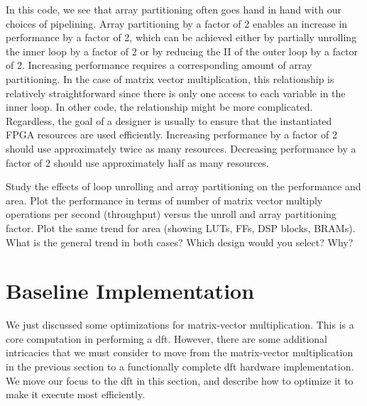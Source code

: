 In this code, we see that array partitioning often goes hand in hand with our choices of pipelining. Array partitioning by a factor of 2 enables an increase in performance by a factor of 2, which can be achieved either by partially unrolling the inner loop by a factor of 2 or by reducing the II of the outer loop by a factor of 2.  Increasing performance requires a corresponding amount of array partitioning.  In the case of matrix vector multiplication, this relationship is relatively straightforward since there is only one access to each variable in the inner loop.  In other code, the relationship might be more complicated.  Regardless, the goal of a designer is usually to ensure that the instantiated FPGA resources are used efficiently.  Increasing performance by a factor of 2 should use approximately twice as many resources.  Decreasing performance by a factor of 2 should use approximately half as many resources.

\begin{exercise}
Study the effects of loop unrolling and array partitioning on the performance and area. Plot the performance in terms of number of matrix vector multiply operations per second (throughput) versus the unroll and array partitioning factor. Plot the same trend for area (showing LUTs, FFs, DSP blocks, BRAMs). What is the general trend in both cases? Which design would you select? Why?
\end{exercise} 


\section{Baseline Implementation}
\label{subsec:dft_implementation}

We just discussed some optimizations for matrix-vector multiplication. This is a core computation in performing a \gls{dft}. However, there are some additional intricacies that we must consider to move from the matrix-vector multiplication in the previous section to a functionally complete \gls{dft} hardware implementation. We move our focus to the \gls{dft} in this section, and describe how to optimize it to make it execute most efficiently.  

